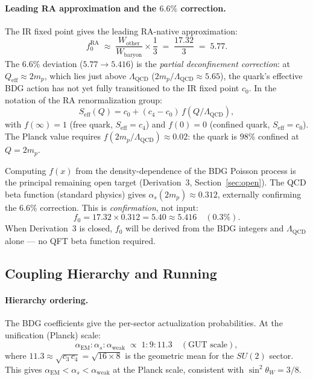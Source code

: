 \documentclass[11pt,a4paper]{article}
\begin{document}
\paragraph{Leading RA approximation and the $6.6\%$ correction.}
The IR fixed point gives the leading RA-native approximation:
\begin{equation}
  f_0^{\mathrm{RA}} \;\approx\; \frac{W_{\mathrm{other}}}{W_{\mathrm{baryon}}}
  \times \frac{1}{3} \;=\; \frac{17.32}{3} \;=\; 5.77.
  \label{eq:f0_RA_approx}
\end{equation}
The $6.6\%$ deviation ($5.77 \to 5.416$) is the \emph{partial
deconfinement correction}: at $Q_{\mathrm{eff}} \approx 2m_p$, which
lies just above $\Lambda_{\mathrm{QCD}}$ ($2m_p/\Lambda_{\mathrm{QCD}} \approx 5.65$),
the quark's effective BDG action has not yet fully transitioned to the
IR fixed point $c_0$.  In the notation of the RA renormalization group:
\begin{equation}
  S_{\mathrm{eff}}(Q) = c_0 + (c_4-c_0)\,f(Q/\Lambda_{\mathrm{QCD}}),
  \label{eq:Seff_running}
\end{equation}
with $f(\infty)=1$ (free quark, $S_{\mathrm{eff}}=c_4$) and $f(0)=0$
(confined quark, $S_{\mathrm{eff}}=c_0$).  The Planck value requires
$f(2m_p/\Lambda_{\mathrm{QCD}}) \approx 0.02$: the quark is $98\%$
confined at $Q=2m_p$.

Computing $f(x)$ from the density-dependence of the BDG Poisson
process is the principal remaining open target (Derivation~3,
Section~\ref{sec:open}).  The QCD beta function (standard physics)
gives $\alpha_s(2m_p)\approx 0.312$, externally confirming the $6.6\%$
correction.  This is \emph{confirmation}, not input:
\begin{equation}
  f_0 = 17.32 \times 0.312 = 5.40 \approx 5.416 \quad (0.3\%).
  \label{eq:f0_rasm}
\end{equation}
When Derivation~3 is closed, $f_0$ will be derived from the BDG
integers and $\Lambda_{\mathrm{QCD}}$ alone --- no QFT beta function
required.

\subsection{Coupling Hierarchy and Running}
\label{sec:coupling_hierarchy}

\paragraph{Hierarchy ordering.}
The BDG coefficients give the per-sector actualization probabilities.
At the unification (Planck) scale:
\begin{equation}
  \alpha_{\mathrm{EM}} : \alpha_s : \alpha_{\mathrm{weak}}
  \;\propto\; 1 : 9 : 11.3
  \quad (\text{GUT scale}),
  \label{eq:coupling_ratios}
\end{equation}
where $11.3 \approx \sqrt{c_3\,c_4} = \sqrt{16\times 8}$ is the geometric
mean for the $SU(2)$ sector.  This gives $\alpha_{\mathrm{EM}} < \alpha_s < \alpha_{\mathrm{weak}}$
at the Planck scale, consistent with $\sin^2\theta_W = 3/8$.
\end{document}
